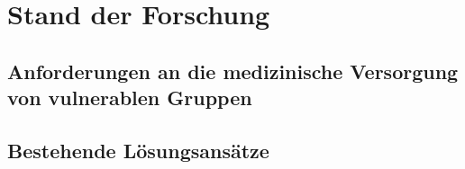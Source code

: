\chapter{Stand der Forschung}\label{ch:relatedWork}



\section{Anforderungen an die medizinische Versorgung von vulnerablen Gruppen}

\section{Bestehende Lösungsansätze}